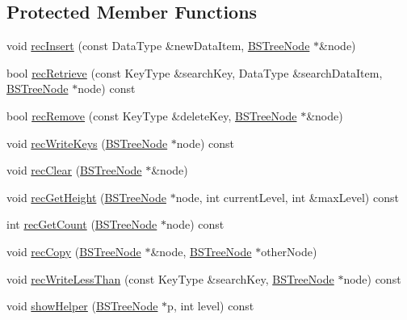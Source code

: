 \subsection*{Protected Member Functions}
\begin{DoxyCompactItemize}
\item 
void \hyperlink{class_b_s_tree_a6f3c9d9e0e06e3bcd52834c48d573f12}{rec\-Insert} (const Data\-Type \&new\-Data\-Item, \hyperlink{class_b_s_tree_1_1_b_s_tree_node}{B\-S\-Tree\-Node} $\ast$\&node)
\item 
bool \hyperlink{class_b_s_tree_a52621024ec6523e8dffa77580aa5e2b0}{rec\-Retrieve} (const Key\-Type \&search\-Key, Data\-Type \&search\-Data\-Item, \hyperlink{class_b_s_tree_1_1_b_s_tree_node}{B\-S\-Tree\-Node} $\ast$node) const 
\item 
bool \hyperlink{class_b_s_tree_a86076589422d70f9b2ac69d3217d5ef8}{rec\-Remove} (const Key\-Type \&delete\-Key, \hyperlink{class_b_s_tree_1_1_b_s_tree_node}{B\-S\-Tree\-Node} $\ast$\&node)
\item 
void \hyperlink{class_b_s_tree_af9aa9675f0e2d264371ce8826c4e2128}{rec\-Write\-Keys} (\hyperlink{class_b_s_tree_1_1_b_s_tree_node}{B\-S\-Tree\-Node} $\ast$node) const 
\item 
void \hyperlink{class_b_s_tree_ad8cb8bd9aadee7296e35499f01268c8b}{rec\-Clear} (\hyperlink{class_b_s_tree_1_1_b_s_tree_node}{B\-S\-Tree\-Node} $\ast$\&node)
\item 
void \hyperlink{class_b_s_tree_ad16a44f4bf6249dac7ef04e9b4108d50}{rec\-Get\-Height} (\hyperlink{class_b_s_tree_1_1_b_s_tree_node}{B\-S\-Tree\-Node} $\ast$node, int current\-Level, int \&max\-Level) const 
\item 
int \hyperlink{class_b_s_tree_a66ecc4a7bf33cbc8b509720f2fbe3d36}{rec\-Get\-Count} (\hyperlink{class_b_s_tree_1_1_b_s_tree_node}{B\-S\-Tree\-Node} $\ast$node) const 
\item 
void \hyperlink{class_b_s_tree_ae619346eb3e5af655cb4d4472e24881d}{rec\-Copy} (\hyperlink{class_b_s_tree_1_1_b_s_tree_node}{B\-S\-Tree\-Node} $\ast$\&node, \hyperlink{class_b_s_tree_1_1_b_s_tree_node}{B\-S\-Tree\-Node} $\ast$other\-Node)
\item 
void \hyperlink{class_b_s_tree_a525852c9c852811e9df4a758835dd615}{rec\-Write\-Less\-Than} (const Key\-Type \&search\-Key, \hyperlink{class_b_s_tree_1_1_b_s_tree_node}{B\-S\-Tree\-Node} $\ast$node) const 
\item 
void \hyperlink{class_b_s_tree_a44b3002e3476eb410468a4b9aaaa73ef}{show\-Helper} (\hyperlink{class_b_s_tree_1_1_b_s_tree_node}{B\-S\-Tree\-Node} $\ast$p, int level) const 
\end{DoxyCompactItemize}
